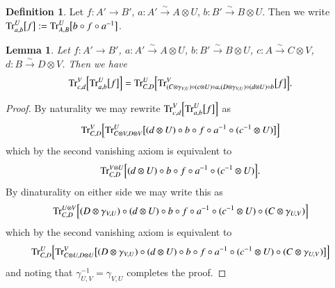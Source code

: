 \documentclass{amsart}
\def\tn{\textnormal}
\def\Trace{\tn{Tr}}
\def\to{\rightarrow}
\newcommand{\To}[1]{\xrightarrow{#1}}
\newtheorem{lemma}[subsubsection]{Lemma}
\theoremstyle{remark}
\theoremstyle{definition}
\newtheorem{definition}[subsubsection]{Definition}
\begin{document}
\begin{definition}
 Let $f:A'\to B'$, $a:A'\To{\sim} A\otimes U$, $b:B'\To{\sim} B\otimes U$.  Then we write $\Trace_{a,b}^U\big[f\big]:=\Trace_{A,B}^U\big[b\circ f\circ a^{-1}\big]$.
\end{definition}
\begin{lemma}
 Let $f:A'\to B'$, $a:A'\To{\sim} A\otimes U$, $b:B'\To{\sim} B\otimes U$, $c:A\To{\sim} C\otimes V$, $d:B\To{\sim} D\otimes V$.  Then we have
 \begin{equation}
  \Trace_{c,d}^V\Big[\Trace_{a,b}^U\big[f\big]\Big]=\Trace_{C,D}^U\Big[\Trace_{(C\otimes\gamma_{V,U})\circ(c\otimes U)\circ a,(D\otimes\gamma_{V,U})\circ(d\otimes U)\circ b}^V\big[f\big]\Big].
 \end{equation}
\end{lemma}
\begin{proof}
 By naturality we may rewrite $\Trace_{c,d}^V\Big[\Trace_{a,b}^U\big[f\big]\Big]$ as
 \[\Trace_{C,D}^V\Big[\Trace_{C\otimes V,D\otimes V}^U\big[(d\otimes U)\circ b\circ f\circ a^{-1}\circ (c^{-1}\otimes U)\big]\Big]\]
 which by the second vanishing axiom is equivalent to
 \[\Trace_{C,D}^{V\otimes U}\Big[(d\otimes U)\circ b\circ f\circ a^{-1}\circ (c^{-1}\otimes U)\Big].\]
 By dinaturality on either side we may write this as
 \[\Trace_{C,D}^{U\otimes V}\Big[(D\otimes\gamma_{V,U})\circ(d\otimes U)\circ b\circ f\circ a^{-1}\circ (c^{-1}\otimes U)\circ(C\otimes\gamma_{U,V})\Big]\]
 which by the second vanishing axiom is equivalent to
 \[\Trace_{C,D}^U\Big[\Trace_{C\otimes U,D\otimes U}^V\big[(D\otimes\gamma_{V,U})\circ(d\otimes U)\circ b\circ f\circ a^{-1}\circ (c^{-1}\otimes U)\circ(C\otimes\gamma_{U,V})\big]\Big]\]
 and noting that $\gamma_{U,V}^{-1}=\gamma_{V,U}$ completes the proof.
\end{proof}
\end{document}
